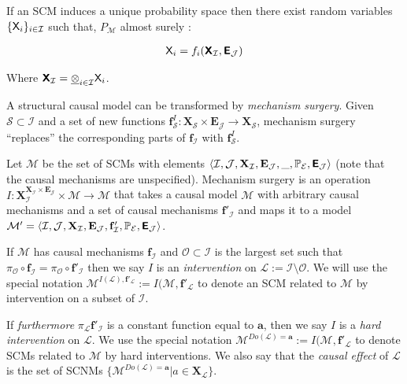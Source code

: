 If an SCM induces a unique probability space then there exist random variables $\{\mathsf{X}_i\}_{i\in\mathcal{I}}$ such that, $P_{\mathcal{M}}$ almost surely \citet{bongers_theoretical_2016}:

\begin{align}
	\mathsf{X}_i = f_i(\bm{\mathsf{X}}_{\mathcal{I}},\bm{\mathsf{E}}_{\mathcal{J}})
\end{align}

Where $\bm{\mathsf{X}}_{\mathcal{I}} = \underline{\otimes}_{i\in \mathcal{I}} \mathsf{X}_i$.

A structural causal model can be transformed by \emph{mechanism surgery}. Given $\mathcal{S}\subset\mathcal{I}$ and a set of new functions $\mathbf{f}^I_{\mathcal{S}}:\mathbf{X}_{\mathcal{S}}\times\mathbf{E}_{\mathcal{J}}\to\mathbf{X}_{\mathcal{S}}$, mechanism surgery ``replaces'' the corresponding parts of $\mathbf{f}_{\mathcal{I}}$ with $\mathbf{f}^I_{\mathcal{S}}$.

\begin{definition}
Let $\mathscr{M}$ be the set of SCMs with elements $\langle \mathcal{I},\mathcal{J},\mathbf{X}_{\mathcal{I}},\mathbf{E}_{\mathcal{J}},\_,\mathbb{P}_{\mathcal{E}},\bm{\mathsf{E}}_{\mathcal{J}}\rangle$ (note that the causal mechanisms are unspecified). Mechanism surgery is an operation $I:\mathbf{X}_{\mathcal{I}}^{\mathbf{X}_{\mathcal{I}}\times\mathbf{E}_{\mathcal{J}}}\times \mathscr{M}\to\mathscr{M}$ that takes a causal model $\mathcal{M}$ with arbitrary causal mechanisms and a set of causal mechanisms $\mathbf{f}'_{\mathcal{I}}$ and maps it to a model $\mathcal{M}'=\langle \mathcal{I},\mathcal{J},\mathbf{X}_{\mathcal{I}},\mathbf{E}_{\mathcal{J}},\mathbf{f}'_{\mathcal{I}},\mathbb{P}_{\mathcal{E}},\bm{\mathsf{E}}_{\mathcal{J}}\rangle$.

If $\mathcal{M}$ has causal mechanisms $\mathbf{f}_{\mathcal{I}}$ and $\mathcal{O}\subset\mathcal{I}$ is the largest set such that $\pi_{\mathcal{O}}\circ\mathbf{f}_{\mathcal{I}}=\pi_{\mathcal{O}}\circ\mathbf{f}'_{\mathcal{I}}$ then we say $I$ is an \emph{intervention} on $\mathcal{L}:=\mathcal{I}\setminus\mathcal{O}$. We will use the special notation $\mathcal{M}^{I(\mathcal{L}),\mathbf{f}'_{\mathcal{L}}}:=I(\mathcal{M},\mathbf{f}'_{\mathcal{L}}$ to denote an SCM related to $\mathcal{M}$ by intervention on a subset of $\mathcal{I}$.

If \emph{furthermore} $\pi_{\mathcal{L}}\mathbf{f}'_{\mathcal{I}}$ is a constant function equal to $\mathbf{a}$, then we say $I$ is a \emph{hard intervention} on $\mathcal{L}$. We use the special notation $\mathcal{M}^{Do(\mathcal{L})=\mathbf{a}}:=I(\mathcal{M},\mathbf{f}'_{\mathcal{L}}$ to denote SCMs related to $\mathcal{M}$ by hard interventions. We also say that the \emph{causal effect} of $\mathcal{L}$ is the set of SCNMs $\{\mathcal{M}^{Do(\mathcal{L})=\mathbf{a}}|a\in \mathbf{X}_{\mathcal{L}}\}$.
\end{definition}

